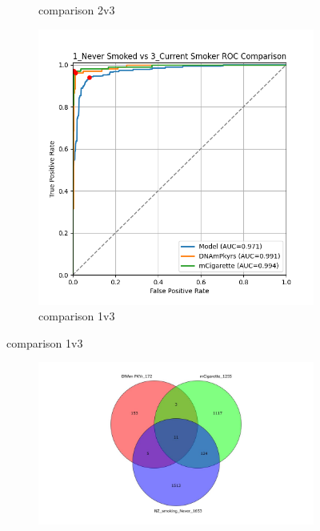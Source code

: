 \documentclass{article}
\begin{document}
\begin{figure}
\begin{subfigure}{0.48\textwidth}
        \caption{comparison 2v3}
    \end{subfigure}
    \par\vspace{0.5em}
    \begin{subfigure}{0.48\textwidth}
        \centering
        \includegraphics[width=\linewidth]{comparison_1v3_roc.png}
        \caption{comparison 1v3}
    \end{subfigure}
\end{figure}


\begin{figure}
    \centering
    \begin{subfigure}{\textwidth}
        \centering
        \includegraphics[width=\linewidth]{Venn_NZnever.jpg}
    \end{subfigure}
\end{figure}
\end{document}
